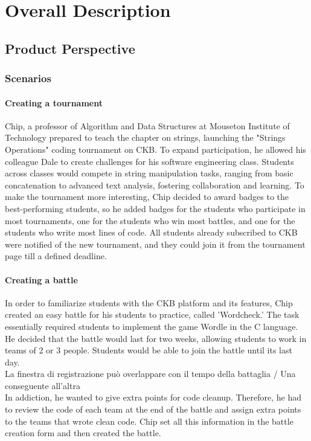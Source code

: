 \chapter{Overall Description}
\section{Product Perspective}
\subsection{Scenarios}

\subsubsection{Creating a tournament}
Chip, a professor of Algorithm and Data Structures at Mouseton Institute of Technology prepared to teach the chapter on strings, launching the "Strings Operations" coding tournament on CKB.
To expand participation, he allowed his colleague Dale to create challenges for his software engineering class.
Students across classes would compete in string manipulation tasks, ranging from basic concatenation to advanced text analysis, fostering collaboration and learning.
To make the tournament more interesting, Chip decided to award badges to the best-performing students, so he added badges for the students who participate in most tournaments, one for the students who win most battles, and one for the students who write most lines of code.
All students already subscribed to CKB were notified of the new tournament, and they could join it from the tournament page till a defined deadline.

\subsubsection{Creating a battle}
In order to familiarize students with the CKB platform and its features, Chip created an easy battle for his students to practice, called 'Wordcheck.' 
The task essentially required students to implement the game Wordle in the C language. 
He decided that the battle would last for two weeks, allowing students to work in teams of 2 or 3 people. Students would be able to join the battle until its last day.
\\ {\color{red} La finestra di registrazione può overlappare con il tempo della battaglia / Una conseguente all'altra} \\
In addiction, he wanted to give extra points for code cleanup. 
Therefore, he had to review the code of each team at the end of the battle and assign extra points to the teams that wrote clean code. 
Chip set all this information in the battle creation form and then created the battle.

